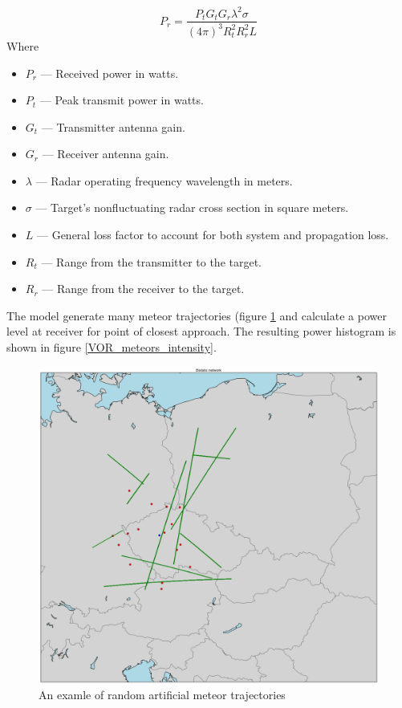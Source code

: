 \documentclass[twoside]{ctuthesis}
\theoremstyle{plain}
\theoremstyle{definition}
\theoremstyle{note}
\begin{document}
\begin{equation}
P_r = \frac{P_t G_t G_r \lambda^2 \sigma}{(4 \pi)^3 R_t ^2 R_r ^2 L}
\label{Radar_equation}
\end{equation}
Where 
\begin{itemize}
\item $P_r$ — Received power in watts.
\item $P_t$ — Peak transmit power in watts.
\item $G_t$ — Transmitter antenna gain.
\item $G_r$ — Receiver antenna gain.
\item $\lambda$ — Radar operating frequency wavelength in meters.
\item $\sigma$ — Target's nonfluctuating radar cross section in square meters.
\item $L$ — General loss factor to account for both system and propagation loss.
\item $R_t$ — Range from the transmitter to the target.
\item $R_r$ — Range from the receiver to the target. 
\end{itemize}

The model generate many meteor trajectories (figure \ref{VOR_meteors} and calculate a power level at receiver for point of closest approach. The resulting power histogram is shown in figure \ref{VOR_meteors_intensity}.

\begin{figure}
\includegraphics[width=\textwidth]{./img/Modeled_meteor_trajectories.png}
\caption{An examle of random artificial meteor trajectories}
\label{VOR_meteors}
\end{figure}
\end{document}
